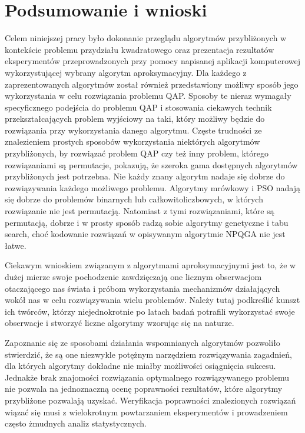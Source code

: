 \chapter{Podsumowanie i wnioski}
\label{cha:wnioski}
Celem niniejszej pracy było dokonanie przeglądu algorytmów przybliżonych w kontekście problemu przydziału kwadratowego oraz prezentacja rezultatów eksperymentów przeprowadzonych przy pomocy napisanej aplikacji komputerowej wykorzystującej wybrany algorytm aproksymacyjny. Dla każdego z zaprezentowanych algorytmów został również przedstawiony możliwy sposób jego wykorzystania w celu rozwiązania problemu QAP. Sposoby te nieraz wymagały specyficznego podejścia do problemu QAP i stosowania ciekawych technik przekształcających problem wyjściowy na taki, który możliwy będzie do rozwiązania przy wykorzystania danego algorytmu. Częste trudności ze znalezieniem prostych sposobów wykorzystania niektórych algorytmów przybliżonych, by rozwiązać problem QAP czy też inny problem, którego rozwiązaniami są permutacje, pokazują, że szeroka gama dostępnych algorytmów przybliżonych jest potrzebna. Nie każdy znany algorytm nadaje się dobrze do rozwiązywania każdego możliwego problemu. Algorytmy mrówkowy i PSO nadają się dobrze do problemów binarnych lub całkowitoliczbowych, w których rozwiązanie nie jest permutacją. Natomiast z tymi rozwiązaniami, które są permutacją, dobrze i w prosty sposób radzą sobie algorytmy genetyczne i tabu search, choć kodowanie rozwiązań w opisywanym algorytmie NPQGA nie jest łatwe.

Ciekawym wnioskiem związanym z algorytmami aproksymacyjnymi jest to, że w dużej mierze swoje pochodzenie zawdzięczają one licznym obserwacjom otaczającego nas świata i próbom wykorzystania mechanizmów działających wokół nas w celu rozwiązywania wielu problemów. Należy tutaj podkreślić kunszt ich twórców, którzy niejednokrotnie po latach badań potrafili wykorzystać swoje obserwacje i stworzyć liczne algorytmy wzorując się na naturze.

Zapoznanie się ze sposobami działania wspomnianych algorytmów pozwoliło stwierdzić, że są one niezwykle potężnym narzędziem rozwiązywania zagadnień, dla których algorytmy dokładne nie miałby możliwości osiągnięcia sukcesu. Jednakże brak znajomości rozwiązania optymalnego rozwiązywanego problemu nie pozwala na jednoznaczną ocenę poprawności rezultatów, które algorytmy przybliżone pozwalają uzyskać. Weryfikacja poprawności znalezionych rozwiązań wiązać się musi z wielokrotnym powtarzaniem eksperymentów i prowadzeniem często żmudnych analiz statystycznych. 

